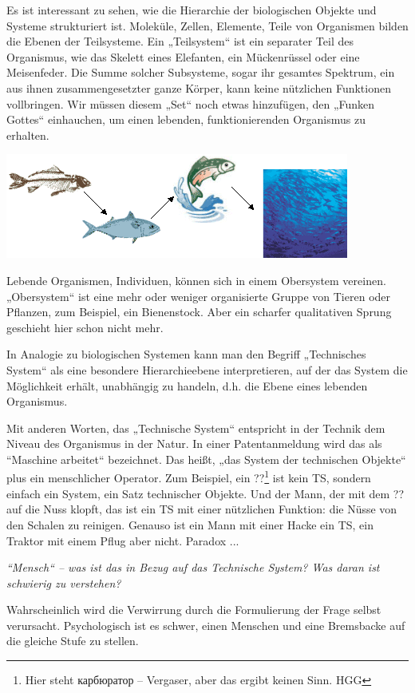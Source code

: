 \documentclass[11pt,a4paper]{article}
\begin{document}
Es ist interessant zu sehen, wie die Hierarchie der biologischen Objekte und
Systeme strukturiert ist. Moleküle, Zellen, Elemente, Teile von Organismen
bilden die Ebenen der Teilsysteme.  Ein „Teilsystem“ ist ein separater Teil
des Organismus, wie das Skelett eines Elefanten, ein Mückenrüssel oder eine
Meisenfeder. Die Summe solcher Subsysteme, sogar ihr gesamtes Spektrum, ein
aus ihnen zusammengesetzter ganze Körper, kann keine nützlichen Funktionen
vollbringen.  Wir müssen diesem „Set“ noch etwas hinzufügen, den „Funken
Gottes“ einhauchen, um einen lebenden, funktionierenden Organismus zu
erhalten.
\begin{center}
 \includegraphics[width=.6\textwidth]{mts-2.png}
\end{center}

Lebende Organismen, Individuen, können sich in einem Obersystem vereinen.
„Obersystem“ ist eine mehr oder weniger organisierte Gruppe von Tieren oder
Pflanzen, zum Beispiel, ein Bienenstock. Aber ein scharfer
qualitativen Sprung geschieht hier schon nicht mehr. 

In Analogie zu biologischen Systemen kann man den Begriff „Technisches System“
als eine besondere Hierarchieebene interpretieren, auf der das System die
Möglichkeit erhält, unabhängig zu handeln, d.h. die Ebene eines lebenden
Organismus.

Mit anderen Worten, das „Technische System“ entspricht in der Technik dem
Niveau des Organismus in der Natur. In einer Patentanmeldung wird das als
“Maschine arbeitet“ bezeichnet. Das heißt, „das System der technischen
Objekte“ plus ein menschlicher Operator. Zum Beispiel, ein ??\footnote{Hier
  steht \foreignlanguage{russian}{карбюратор} -- Vergaser, aber das ergibt
  keinen Sinn. HGG} ist kein TS, sondern einfach ein System, ein Satz
technischer Objekte. Und der Mann, der mit dem ?? auf die Nuss klopft, das ist
ein TS mit einer nützlichen Funktion: die Nüsse von den Schalen zu reinigen.
Genauso ist ein Mann mit einer Hacke ein TS, ein Traktor mit einem Pflug aber
nicht. Paradox ...

\emph{“Mensch“ -- was ist das in Bezug auf das Technische System? Was daran
  ist schwierig zu verstehen? }

Wahrscheinlich wird die Verwirrung durch die Formulierung der Frage selbst
verursacht.  Psychologisch ist es schwer, einen Menschen und eine Bremsbacke
auf die gleiche Stufe zu stellen.
\end{document}
